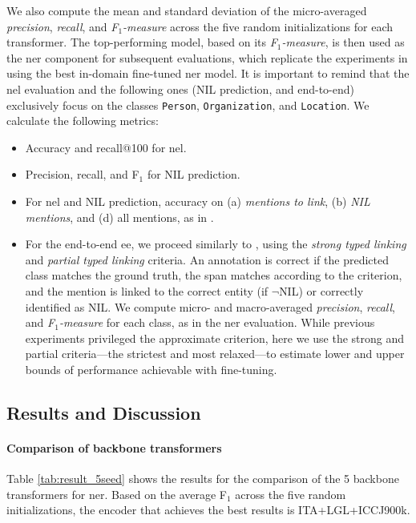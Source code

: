 We also compute the mean and standard deviation of the micro-averaged \textit{precision}, \textit{recall}, and \textit{F$_1$-measure} across the five random initializations for each transformer. The top-performing model, based on its \textit{F$_1$-measure}, is then used as the \ac{ner} component for subsequent evaluations, which replicate the experiments in  using the best in-domain fine-tuned \ac{ner} model.
It is important to remind that the \ac{nel} evaluation and the following ones (NIL prediction, and end-to-end) exclusively focus on the classes \texttt{Person}, \texttt{Organization}, and \texttt{Location}.
We calculate the following metrics:
\begin{itemize}
    \item Accuracy and recall@100 for \ac{nel}.
    \item Precision, recall, and F$_1$ for NIL prediction.
    \item For \ac{nel} and NIL prediction, accuracy on (a) \textit{mentions to link}, (b) \textit{NIL mentions}, and (d) all mentions, as in .
    \item For the end-to-end \ac{ee}, we proceed similarly to , using the \textit{strong typed linking} and \textit{partial typed linking} criteria. An annotation is correct if the predicted class matches the ground truth, the span matches according to the criterion, and the mention is linked to the correct entity (if $\neg$NIL) or correctly identified as NIL. We compute micro- and macro-averaged \textit{precision}, \textit{recall}, and \textit{F$_1$-measure} for each class, as in the \ac{ner} evaluation. While previous experiments privileged the approximate criterion, here we use the strong and partial criteria---the strictest and most relaxed---to estimate lower and upper bounds of performance achievable with fine-tuning.
\end{itemize}


\subsection{Results and Discussion}

\paragraph{Comparison of backbone transformers}
Table \ref{tab:result_5seed} shows the results for the comparison of the 5 backbone transformers for \ac{ner}.
Based on the average F$_1$ across the five random initializations, the encoder that achieves the best results is ITA+LGL+ICCJ900k.

